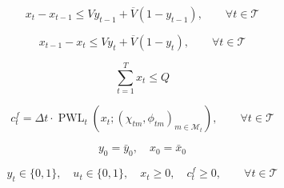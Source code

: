 \documentclass{article}
\begin{document}
\begin{equation}
x_t - x_{t-1} \le V y_{t-1} + \overline{V}(1-y_{t-1}),
\qquad \forall t \in \mathcal{T}
\tag{1f}
\end{equation}

\begin{equation}
x_{t-1} - x_t \le V y_t + \overline{V}(1-y_t),
\qquad \forall t \in \mathcal{T}
\tag{1g}
\end{equation}

\begin{equation}
\sum_{t=1}^T x_t \le Q
\tag{1h}
\end{equation}

\begin{equation}
c_t^f = \Delta t \cdot \operatorname{PWL}_t(x_t;(\chi_{tm},\phi_{tm})_{m\in\mathcal{M}_t}),
\qquad
\forall t \in \mathcal{T}
\tag{1i}
\end{equation}

\begin{equation}
y_0 = \bar{y}_0,\quad x_0 = \bar{x}_0
\tag{1j}
\end{equation}

\begin{equation}
y_t \in \{0,1\},\quad
u_t \in \{0,1\},\quad
x_t \ge 0,\quad
c_t^f \ge 0,
\qquad \forall t \in \mathcal{T}
\tag{1k}
\end{equation}
\end{document}
